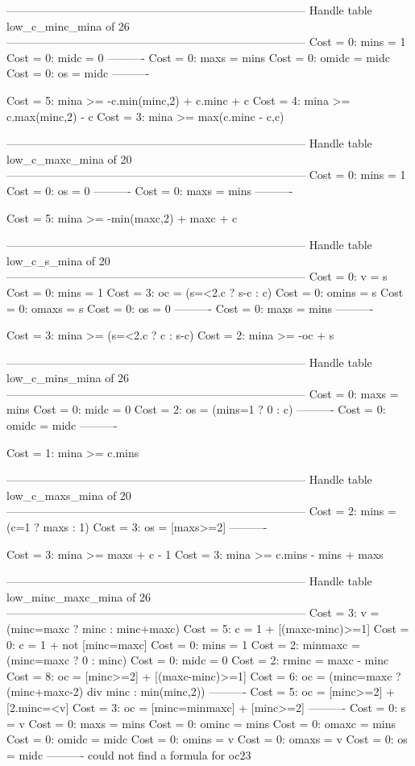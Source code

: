 --------------------------------------------------------------------------------
Handle table low_c_minc_mina of 26
--------------------------------------------------------------------------------
Cost =  0:  mins  = 1
Cost =  0:  midc  = 0
----------
Cost =  0:  maxs  = mins
Cost =  0:  omidc = midc
Cost =  0:  os    = midc
----------

Cost =  5:  mina >= -c.min(minc,2) + c.minc + c
Cost =  4:  mina >= c.max(minc,2) - c
Cost =  3:  mina >= max(c.minc - c,c)

--------------------------------------------------------------------------------
Handle table low_c_maxc_mina of 20
--------------------------------------------------------------------------------
Cost =  0:  mins = 1
Cost =  0:  os   = 0
----------
Cost =  0:  maxs = mins
----------

Cost =  5:  mina >= -min(maxc,2) + maxc + c

--------------------------------------------------------------------------------
Handle table low_c_s_mina of 20
--------------------------------------------------------------------------------
Cost =  0:  v     = s
Cost =  0:  mins  = 1
Cost =  3:  oc    = (s=<2.c ? s-c : c)
Cost =  0:  omins = s
Cost =  0:  omaxs = s
Cost =  0:  os    = 0
----------
Cost =  0:  maxs  = mins
----------

Cost =  3:  mina >= (s=<2.c ? c : s-c)
Cost =  2:  mina >= -oc + s

--------------------------------------------------------------------------------
Handle table low_c_mins_mina of 26
--------------------------------------------------------------------------------
Cost =  0:  maxs  = mins
Cost =  0:  midc  = 0
Cost =  2:  os    = (mins=1 ? 0 : c)
----------
Cost =  0:  omidc = midc
----------

Cost =  1:  mina >= c.mins

--------------------------------------------------------------------------------
Handle table low_c_maxs_mina of 20
--------------------------------------------------------------------------------
Cost =  2:  mins = (c=1 ? maxs : 1)
Cost =  3:  os   = [maxs>=2]
----------

Cost =  3:  mina >= maxs + c - 1
Cost =  3:  mina >= c.mins - mins + maxs

--------------------------------------------------------------------------------
Handle table low_minc_maxc_mina of 26
--------------------------------------------------------------------------------
Cost =  3:  v       = (minc=maxc ? minc : minc+maxc)
Cost =  5:  c       = 1 + [(maxc-minc)>=1]
Cost =  0:  c       = 1 + not [minc=maxc]
Cost =  0:  mins    = 1
Cost =  2:  minmaxc = (minc=maxc ? 0 : minc)
Cost =  0:  midc    = 0
Cost =  2:  rminc   = maxc - minc
Cost =  8:  oc      = [minc>=2] + [(maxc-minc)>=1]
Cost =  6:  oc      = (minc=maxc ? (minc+maxc-2) div minc : min(minc,2))
----------
Cost =  5:  oc      = [minc>=2] + [2.minc=<v]
Cost =  3:  oc      = [minc=minmaxc] + [minc>=2]
----------
Cost =  0:  s       = v
Cost =  0:  maxs    = mins
Cost =  0:  ominc   = mins
Cost =  0:  omaxc   = mins
Cost =  0:  omidc   = midc
Cost =  0:  omins   = v
Cost =  0:  omaxs   = v
Cost =  0:  os      = midc
----------
could not find a formula for oc23


